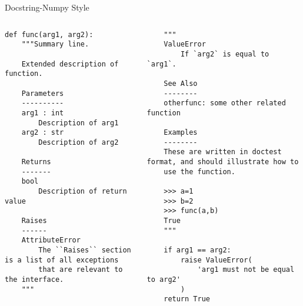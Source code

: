 \begin{frame}[fragile]{Docstring-Numpy Style}
    \tiny
    \begin{columns}
        \begin{lstlisting}
def func(arg1, arg2):
    """Summary line.

    Extended description of function.

    Parameters
    ----------
    arg1 : int
        Description of arg1
    arg2 : str
        Description of arg2

    Returns
    -------
    bool
        Description of return value

    Raises
    ------
    AttributeError
        The ``Raises`` section is a list of all exceptions
        that are relevant to the interface.
    """
            \end{lstlisting}
            \begin{lstlisting}
    """
    ValueError
        If `arg2` is equal to `arg1`.

    See Also
    --------
    otherfunc: some other related function

    Examples
    --------
    These are written in doctest format, and should illustrate how to
    use the function.

    >>> a=1
    >>> b=2
    >>> func(a,b)
    True
    """

    if arg1 == arg2:
        raise ValueError(
            'arg1 must not be equal to arg2'
        )
    return True
            \end{lstlisting}
    \end{columns}

\end{frame}